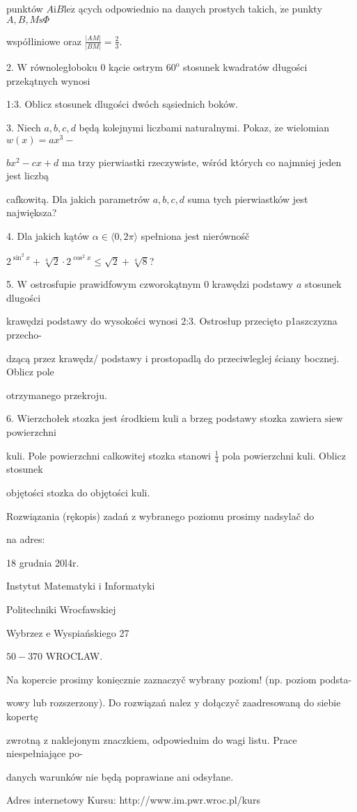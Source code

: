 \documentclass[a4paper,12pt]{article}
\begin{document}
punktów $A\mathrm{i}B\mathrm{l}\mathrm{e}\dot{\mathrm{z}}$ ących odpowiednio na danych prostych takich, $\dot{\mathrm{z}}\mathrm{e}$ punkty $A, B,  M\mathrm{s}\Phi$

współliniowe oraz $\displaystyle \frac{|AM|}{|BM|}=\frac{2}{3}.$

2. $\mathrm{W}$ równoległoboku $0$ kącie ostrym $60^{\mathrm{o}}$ stosunek kwadratów długości przekątnych wynosi

1:3. Oblicz stosunek dlugości dwóch sąsiednich boków.

3. Niech $a, b, c, d$ będą kolejnymi liczbami naturalnymi. Pokaz, $\dot{\mathrm{z}}\mathrm{e}$ wielomian $w(x)=ax^{3}-$

$bx^{2}-cx+d$ ma trzy pierwiastki rzeczywiste, wśród których co najmniej jeden jest liczbą

cafkowitą. Dla jakich parametrów $a, b, c, d$ suma tych pierwiastków jest największa?

4. Dla jakich kątów $\alpha\in\langle 0,  2\pi\rangle$ spełniona jest nierównośč

$2^{\sin^{2}x}+\sqrt[4]{2}\cdot 2^{\cos^{2}x}\leq\sqrt{2}+\sqrt[4]{8}$?

5. $\mathrm{W}$ ostrosfupie prawidfowym czworokątnym $0$ krawędzi podstawy $a$ stosunek dlugości

krawędzi podstawy do wysokości wynosi 2:3. Ostrosłup przecięto p1aszczyzna przecho-

dzącą przez krawędz/ podstawy $\mathrm{i}$ prostopadlą do przeciwleglej ściany bocznej. Oblicz pole

otrzymanego przekroju.

6. Wierzchołek stozka jest środkiem kuli a brzeg podstawy stozka zawiera $\mathrm{s}\mathrm{i}\mathrm{e}\mathrm{w}$ powierzchni

kuli. Pole powierzchni calkowitej stozka stanowi $\displaystyle \frac{1}{4}$ pola powierzchni kuli. Oblicz stosunek

objętości stozka do objętości kuli.

Rozwiązania (rękopis) zadań z wybranego poziomu prosimy nadsylač do

na adres:

18 grudnia 20l4r.

Instytut Matematyki $\mathrm{i}$ Informatyki

Politechniki Wrocfawskiej

Wybrzez $\mathrm{e}$ Wyspiańskiego 27

$50-370$ WROCLAW.

Na kopercie prosimy $\underline{\mathrm{k}\mathrm{o}\mathrm{n}\mathrm{i}\mathrm{e}\mathrm{c}\mathrm{z}\mathrm{n}\mathrm{i}\mathrm{e}}$ zaznaczyč wybrany poziom! (np. poziom podsta-

wowy lub rozszerzony). Do rozwiązań nalez $\mathrm{y}$ dołączyč zaadresowaną do siebie kopertę

zwrotną $\mathrm{z}$ naklejonym znaczkiem, odpowiednim do wagi listu. Prace niespełniające po-

danych warunków nie będą poprawiane ani odsyłane.

Adres internetowy Kursu: http://www.im.pwr.wroc.pl/kurs
\end{document}
